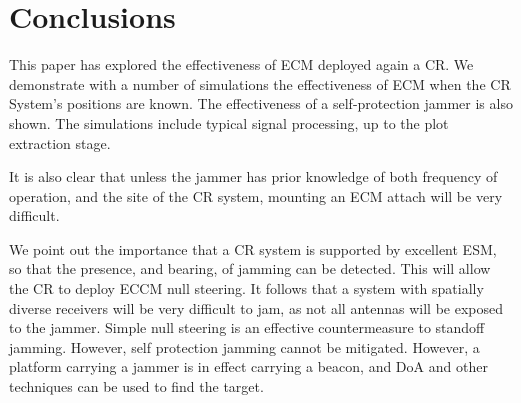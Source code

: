 \documentclass[conference]{IEEEtran}
\begin{document}
\section{Conclusions}

This paper has explored the effectiveness of ECM deployed again a CR. We demonstrate with a number of simulations the effectiveness of ECM when the CR System's positions are known. The effectiveness of a self-protection jammer is also shown. The simulations include typical signal processing, up to the plot extraction stage.

It is also clear that unless the jammer has prior knowledge of both frequency of operation, and the site of the CR system, mounting an ECM attach will be very difficult.

We point out the importance that a CR system is supported by excellent ESM, so that the presence, and bearing, of jamming can be detected. This will allow the CR to deploy ECCM null steering. It follows that a system with spatially diverse receivers will be very difficult to jam, as not all antennas will be exposed to the jammer. Simple null steering is an effective countermeasure to standoff jamming. However, self protection jamming cannot be mitigated. However, a platform carrying a jammer is in effect carrying a beacon, and DoA and other techniques can be used to find the target.

\nopagebreak


\end{document}
